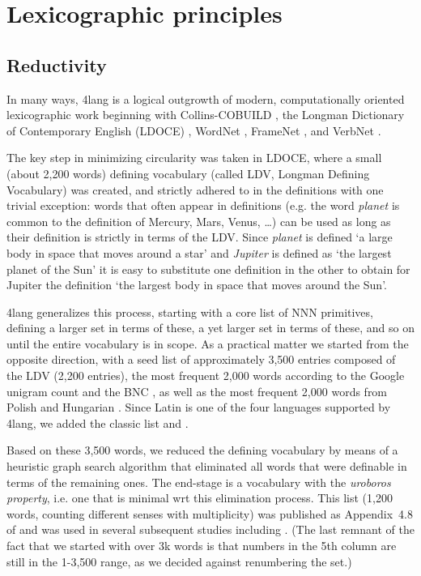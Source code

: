 \documentclass[11pt,bookmarks,bookmarksnumbered,naturalnames,plainpages=false,pdftex,colorlinks=true,urlcolor=blue,bookmarksdepth=subsection,plainpages=false]{paper}
\begin{document}
\section{Lexicographic principles}

\subsection{Reductivity}

In many ways, 4lang is a logical outgrowth of modern, computationally oriented
lexicographic work beginning with Collins-COBUILD \citep{Sinclair:1987}, the
Longman Dictionary of Contemporary English (LDOCE) \citep{Boguraev:1989},
WordNet \citep{Miller:1995}, FrameNet \citep{Fillmore:1998}, and VerbNet
\citep{Kipper:2000}. 

The key step in minimizing circularity was taken in LDOCE, where a small
(about 2,200 words) defining vocabulary (called LDV, Longman Defining
Vocabulary) was created, and strictly adhered to in the definitions with one
trivial exception: words that often appear in definitions (e.g. the word {\it
  planet} is common to the definition of Mercury, Mars, Venus, \ldots) can be
used as long as their definition is strictly in terms of the LDV.  Since {\it
  planet} is defined `a large body in space that moves around a star' and
{\it Jupiter} is defined as `the largest planet of the Sun' it is easy to
substitute one definition in the other to obtain for Jupiter the definition
`the largest body in space that moves around the Sun'. 

4lang generalizes this process, starting with a core list of NNN primitives,
defining a larger set in terms of these, a yet larger set in terms of these,
and so on until the entire vocabulary is in scope. As a practical matter we
started from the opposite direction, with a seed list of approximately 3,500
entries composed of the LDV (2,200 entries), the most frequent 2,000 words
according to the Google unigram count \citep{Brants:2006} and the BNC
\citep{Burnard:1998}, as well as the most frequent 2,000 words from Polish
\citep{Halacsy:2008} and Hungarian \citep{Kornai:2006}.  Since Latin is one of
the four languages supported by 4lang, we added the classic
\cite{Diederich:1939} list and \citep{Whitney:1885}. 

Based on these 3,500 words, we reduced the defining vocabulary by means of a
heuristic graph search algorithm \citep{Acs:2013} that eliminated all words
that were definable in terms of the remaining ones. The end-stage is a
vocabulary with the {\it uroboros property}, i.e. one that is minimal wrt this
elimination process. This list (1,200 words, counting different senses with
multiplicity) was published as Appendix~4.8 of \cite{Kornai:2019} and was used
in several subsequent studies including \citep{Nemeskey:2018}. (The last
remnant of the fact that we started with over 3k words is that numbers in the
5th column are still in the 1-3,500 range, as we decided against renumbering
the set.)
\end{document}

